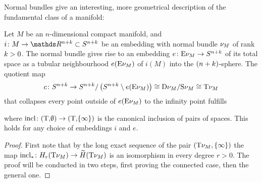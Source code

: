 Normal bundles give an interesting, more geometrical
description of the fundamental class of a manifold:
\begin{Lem}\label{thomisofundcl}
  Let $M$ be an $n$-dimensional compact manifold, and
  $i\colon M\to\R^{n+\rkk}\subset\Sphere{n+\rkk}$ be an embedding with
  normal bundle $\nu_{M}$ of rank $k>0$.
  The normal bundle gives rise to an embedding
  $e\colon \mathrm{E}\nu_{M}\to S^{n+k}$ of its total space
  as a tubular neighbourhood $e(\mathrm{E}\nu_{M})$ of $i(M)$ into the
  $(n+k)$-sphere.
  The quotient map
  \begin{gather*}
    c\colon
    S^{n+k}
    \to S^{n+k}/\left( S^{n+k}\setminus e(\mathrm{E}\nu_{M}) \right)
    \cong \mathrm{D}\nu_{M} / \mathrm{S}\nu_{M}
    \cong \mathrm{T}{\nu_{M}}
  \end{gather*}
  that collapses every point outside of $e(\mathrm{E}\nu_{M})$ to the infinity
  point fulfills
  \begin{center}
  \end{center}
  where $\mathrm{incl}\colon(\mathrm{T}{,}\emptyset)\to(\mathrm{T}{,} \{\infty\})$ is the
  canonical inclusion of pairs of spaces.
  This holds for any choice of embeddings $i$ and $e$.
  \begin{proof}
    First note that by the long exact sequence of the pair 
     $(\mathrm{T}{\nu_{M}}, \{\infty\})$ the map
     ${\mathrm{incl}}_*\colon H_r(\mathrm{T}{\nu_{M}})\to \widetilde H(\mathrm{T}{\nu_{M}})$
    is an isomorphism in every degree $r>0$. The proof will be
    conducted in two steps, first proving the connected case, then
    the general one.
    

\end{proof}
\end{Lem}
